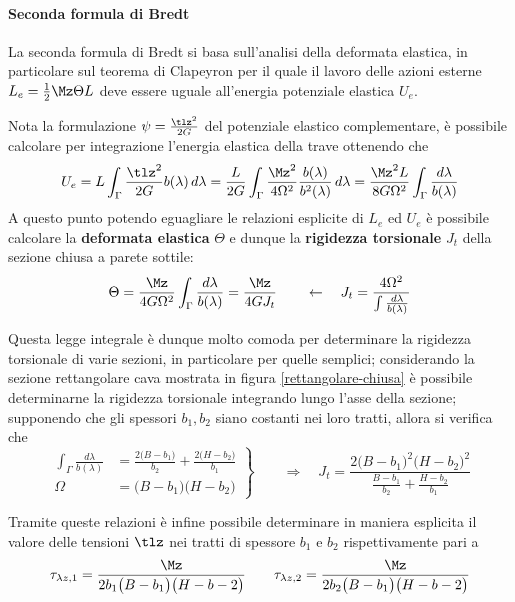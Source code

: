     		\paragraph{Seconda formula di Bredt} La seconda formula di Bredt si basa sull'analisi della deformata elastica, in particolare sul teorema di Clapeyron per il quale il lavoro delle azioni esterne $L_e = \frac 1 2 \Mz\Theta L$ deve essere uguale all'energia potenziale elastica $U_e$.
    		
    		Nota la formulazione $\psi=\frac{\tlz^2}{2G}$ del potenziale elastico complementare, è possibile calcolare per integrazione l'energia elastica della trave ottenendo che
    		\[ U_e = L \int_\Gamma \frac{\tlz^2}{2G}b(\lambda)\, d\lambda = \frac L{2G}\int_\Gamma \frac{\Mz^2}{4\Omega^2}\frac{b(\lambda)}{b^2(\lambda)}\, d\lambda = \frac{\Mz^2L}{8G\Omega^2}\int_\Gamma \frac{d\lambda}{b(\lambda)} \]
    		A questo punto potendo eguagliare le relazioni esplicite di $L_e$ ed $U_e$ è possibile calcolare la \textbf{deformata elastica} $\Theta$ e dunque la \textbf{rigidezza torsionale} $J_t$ della sezione chiusa a parete sottile:
    		\begin{equation}
    			\Theta = \frac{\Mz}{4G\Omega^2}\int_\Gamma \frac{d\lambda}{b(\lambda)} = \frac{\Mz}{4GJ_t} \qquad \leftarrow \quad J_t = \frac{4\Omega^2}{\int \frac{d\lambda}{b(\lambda)}}
    		\end{equation}
			
			Questa legge integrale è dunque molto comoda per determinare la rigidezza torsionale di varie sezioni, in particolare per quelle semplici; considerando la sezione rettangolare cava mostrata in figura \ref{rettangolare-chiusa} è possibile determinarne la rigidezza torsionale integrando lungo l'asse della sezione; supponendo che gli spessori $b_1,b_2$ siano costanti nei loro tratti, allora si verifica che
			\[ \left.\begin{aligned}
				\int_\Gamma \frac{d\lambda}{b(\lambda)}&  = \frac{2\big(B-b_1\big)}{b_2} + \frac{2\big(H-b_2\big)}{b_1} \\ \Omega & = \big(B-b_1\big)\big(H-b_2\big)
			\end{aligned} \right\} \qquad \Rightarrow \quad J_t = \frac{ 2 \big(B-b_1\big)^2\big(H-b_2\big)^2 }{ \frac{B-b_1}{b_2} + \frac{H-b_2}{b_1} }\]
			
			Tramite queste relazioni è infine possibile determinare in maniera esplicita il valore delle tensioni $\tlz$ nei tratti di spessore $b_1$ e $b_2$ rispettivamente pari a 
			\[ \tau_{\lambda z,1} = \frac{\Mz}{2b_1\big(B-b_1\big)\big(H-b-2\big)} \qquad \tau_{\lambda z,2} = \frac{\Mz}{2b_2\big(B-b_1\big)\big(H-b-2\big)} \]
    		
    		
    		
    		
    		
    		
    		
    		
    		
    		
    		
    		
    		
    		
    		
    		